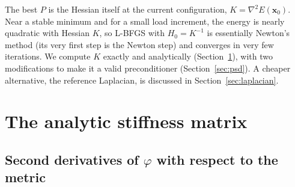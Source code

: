 \documentclass[11pt,a4paper]{article}
\theoremstyle{remark}
\newcommand{\x}{\bm{x}}
\begin{document}
The best $P$ is the Hessian itself at the current configuration, $K=\nabla^2E(\x_0)$. Near a
stable minimum and for a small load increment, the energy is nearly quadratic with Hessian
$K$, so L-BFGS with $H_0=K^{-1}$ is essentially Newton's method (its very first step is the
Newton step) and converges in very few iterations. We compute $K$ exactly and analytically
(Section~\ref{sec:tangent}), with two modifications to make it a valid preconditioner
(Section~\ref{sec:psd}). A cheaper alternative, the reference Laplacian, is discussed in
Section~\ref{sec:laplacian}.

\section{The analytic stiffness matrix}
\label{sec:tangent}

\subsection{Second derivatives of $\varphi$ with respect to the metric}
\end{document}
